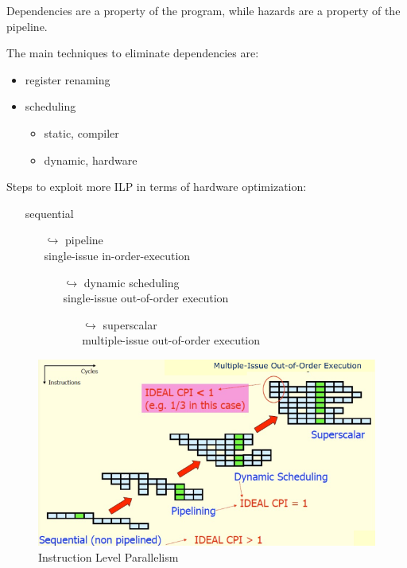 Dependencies are a property of the program, while
hazards are a property of the pipeline.


The main techniques to eliminate dependencies are:
\begin{itemize}
    \item register renaming
    \item scheduling
    \begin{itemize}
        \item static, compiler
        \item dynamic, hardware
    \end{itemize}
\end{itemize}

Steps to exploit more ILP in terms of hardware optimization:
\begin{itemize}
    \item[\textrightarrow] sequential
    \begin{itemize}
        \item[$\hookrightarrow$] pipeline\\ single-issue in-order-execution
        \begin{itemize}
            \item[$\hookrightarrow$] dynamic scheduling\\ single-issue out-of-order execution
            \begin{itemize}
                \item[$\hookrightarrow$] superscalar\\ multiple-issue out-of-order execution
            \end{itemize}
        \end{itemize}
    \end{itemize}
\end{itemize}

\begin{figure}[h]
    \centering
    \includegraphics[scale = 0.35]{images/ILP-scheme}
    \caption{Instruction Level Parallelism}
    \label{fig:ILP-scheme}
\end{figure}
